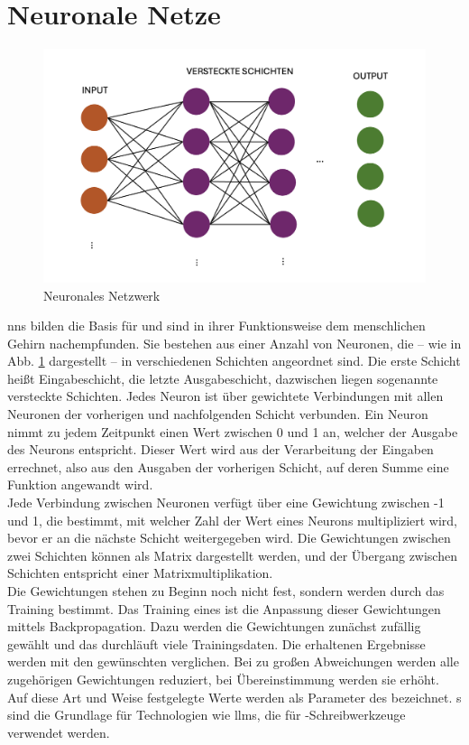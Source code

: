 \documentclass[../main.tex]{subfiles}
\begin{document}
\section{Neuronale Netze}

\begin{figure}[h!]
  \includegraphics[scale=0.6]{bilder/NeuralNetwork.png}
  \caption{Neuronales Netzwerk}
  \label{fig:NN}
\end{figure}

\glspl{nn} bilden die Basis für  und sind in ihrer Funktionsweise dem menschlichen Gehirn nachempfunden. Sie bestehen aus einer Anzahl von Neuronen, die – wie in Abb. \ref{fig:NN} dargestellt – in verschiedenen Schichten angeordnet sind. Die erste Schicht heißt Eingabeschicht, die letzte Ausgabeschicht, dazwischen liegen sogenannte versteckte Schichten. Jedes Neuron ist über gewichtete Verbindungen mit allen Neuronen der vorherigen und nachfolgenden Schicht verbunden. Ein Neuron nimmt zu jedem Zeitpunkt einen Wert zwischen 0 und 1 an, welcher der Ausgabe des Neurons entspricht. Dieser Wert wird aus der Verarbeitung der Eingaben errechnet, also aus den Ausgaben der vorherigen Schicht, auf deren Summe eine Funktion angewandt wird. \\
Jede Verbindung zwischen Neuronen verfügt über eine Gewichtung zwischen -1 und 1, die bestimmt, mit welcher Zahl der Wert eines Neurons multipliziert wird, bevor er an die nächste Schicht weitergegeben wird. Die Gewichtungen zwischen zwei Schichten können als Matrix dargestellt werden, und der Übergang zwischen Schichten entspricht einer Matrixmultiplikation. \\
Die Gewichtungen stehen zu Beginn noch nicht fest, sondern werden durch das Training bestimmt. Das Training eines  ist die Anpassung dieser Gewichtungen mittels Backpropagation. Dazu werden die Gewichtungen zunächst zufällig gewählt und das  durchläuft viele Trainingsdaten. Die erhaltenen Ergebnisse werden mit den gewünschten verglichen. Bei zu großen Abweichungen werden alle zugehörigen Gewichtungen reduziert, bei Übereinstimmung werden sie erhöht. Auf diese Art und Weise festgelegte Werte werden als Parameter des  bezeichnet. s sind die Grundlage für Technologien wie \glspl{llm}, die für -Schreibwerkzeuge verwendet werden. 
\end{document}
